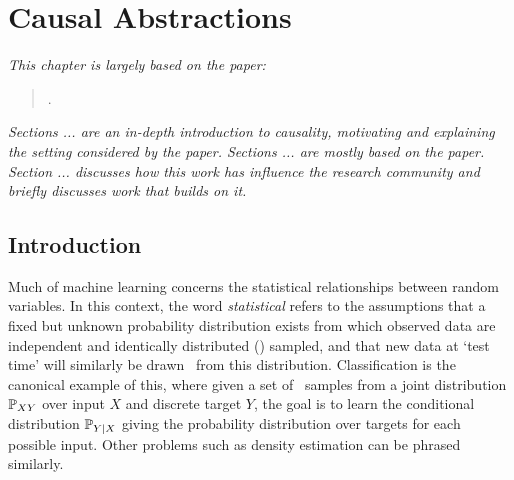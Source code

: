 \chapter{Causal Abstractions}

\ifpdf
    \graphicspath{{Chapter3/Figs/Raster/}{Chapter3/Figs/PDF/}{Chapter3/Figs/}}
\else
    \graphicspath{{Chapter3/Figs/Vector/}{Chapter3/Figs/}}
\fi

\emph{This chapter is largely based on the paper:}


\begin{quote}
.
\end{quote}


\emph{Sections ... are an in-depth introduction to causality, motivating and explaining the setting considered by the paper.
Sections ... are mostly based on the paper. 
Section ... discusses how this work has influence the research community and briefly discusses work that builds on it.}



\section{Introduction}

Much of machine learning concerns the statistical relationships between random variables. In this context, the word \emph{statistical} refers to the assumptions that a fixed but unknown probability distribution exists from which observed data are independent and identically distributed (\iid) sampled, and that new data at `test time' will similarly be drawn \iid~from this distribution.
Classification is the canonical example of this, where given a set of \iid~samples from a joint distribution $\mathbb{P}_{XY}$ over input $X$ and discrete target $Y$, the goal is to learn the conditional distribution $\mathbb{P}_{Y|X}$ giving the probability distribution over targets for each possible input. Other problems such as density estimation can be phrased similarly.


